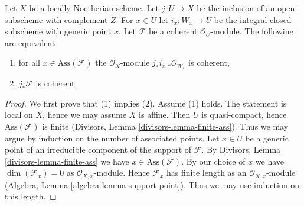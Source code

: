 \begin{lemma}
\label{lemma-check-finiteness-pushforward-on-associated-points}
Let $X$ be a locally Noetherian scheme. Let $j : U \to X$ be the inclusion
of an open subscheme with complement $Z$. For $x \in U$ let
$i_x : W_x \to U$ be the integral closed subscheme with generic point $x$.
Let $\mathcal{F}$ be a coherent $\mathcal{O}_U$-module.
The following are equivalent
\begin{enumerate}
\item for all $x \in \text{Ass}(\mathcal{F})$ the
$\mathcal{O}_X$-module $j_*i_{x, *}\mathcal{O}_{W_x}$ is coherent,
\item $j_*\mathcal{F}$ is coherent.
\end{enumerate}
\end{lemma}

\begin{proof}
We first prove that (1) implies (2). Assume (1) holds.
The statement is local on $X$, hence we may assume $X$ is affine.
Then $U$ is quasi-compact, hence $\text{Ass}(\mathcal{F})$ is finite
(Divisors, Lemma \ref{divisors-lemma-finite-ass}). Thus we may argue by
induction on the number of associated points. Let $x \in U$ be a generic
point of an irreducible component of the support of $\mathcal{F}$.
By Divisors, Lemma \ref{divisors-lemma-finite-ass} we have
$x \in \text{Ass}(\mathcal{F})$. By our choice of $x$ we have
$\dim(\mathcal{F}_x) = 0$ as $\mathcal{O}_{X, x}$-module.
Hence $\mathcal{F}_x$ has finite length as an $\mathcal{O}_{X, x}$-module
(Algebra, Lemma \ref{algebra-lemma-support-point}).
Thus we may use induction on this length.


\end{proof}
